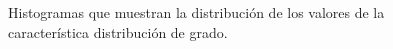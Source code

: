 \documentclass{article}
\begin{document}
\begin{figure}[htbp]

\caption{Histogramas que muestran la distribución de los valores de la característica distribución de grado. }
\label{fig7} 
\end{figure}
\end{document}
